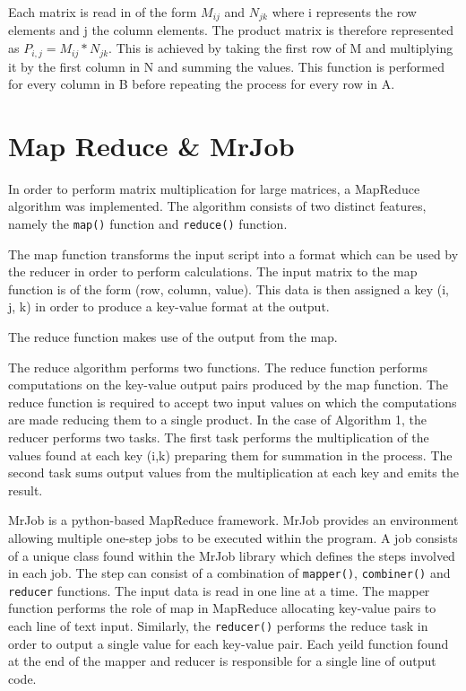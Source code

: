 \documentclass[10pt,twocolumn]{witseiepaper}
\begin{document}
Each matrix is read in of the form $M_{ij}$ and $N_{jk}$ where i represents the row elements and j the column elements. The product matrix is therefore represented as $P_{i,j} = M_{ij} * N_{jk}$. This is achieved by taking the first row of M and multiplying it by the first column in N and summing the values. This function is performed for every column in B before repeating the process for every row in A. 

\section{Map Reduce \& MrJob}

In order to perform matrix multiplication for large matrices, a MapReduce algorithm was implemented. The algorithm consists of two distinct features, namely the \verb|map()| function and \verb|reduce()| function. 

The map function transforms the input script into a format which can be used by the reducer in order to perform calculations. The input matrix to the map function is of the form (row, column, value). This data is then assigned a key (i, j, k) in order to produce a key-value format at the output.

The reduce function makes use of the output from the map. 

The reduce algorithm performs two functions. The reduce function performs computations on the key-value output pairs produced by the map function. The reduce function is required to accept two input values on which the computations are made reducing them to a single product. In the case of Algorithm 1, the reducer performs two tasks. The first task performs the multiplication of the values found at each key (i,k) preparing them for summation in the process. The second task sums output values from the multiplication at each key and emits the result.

MrJob is a python-based MapReduce framework. MrJob provides an environment allowing multiple one-step jobs to be executed within the program. A job consists of a unique class found within the MrJob library which defines the steps involved in each job. The step can  consist of a combination of \verb|mapper()|, \verb|combiner()| and \verb|reducer| functions. The input data is read in one line at a time. The mapper function performs the role of map in MapReduce allocating key-value pairs to each line of text input. Similarly, the \verb|reducer()| performs the reduce task in order to output a single value for each key-value pair.  Each yeild function found at the end of the mapper and reducer is responsible for a single line of output code.
\end{document}
